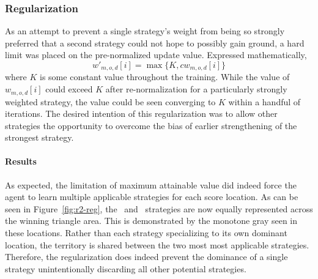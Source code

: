 

\subsubsection*{Regularization}


As an attempt to prevent a single strategy's weight from being so strongly 
preferred that a second strategy could not hope to possibly gain ground,
a hard limit was placed on the pre-normalized update value.
%
Expressed mathematically,
\[
    w'_{m,o,d}[i] = \max\{K,cw_{m,o,d}[i]\}
\]
where $K$ is some constant value throughout the training.
%
While the value of $w_{m,o,d}[i]$ could exceed $K$ after re-normalization
for a particularly strongly weighted strategy,
the value could be seen converging to $K$ within a handful of iterations.
%
The desired intention of this regularization was to allow other strategies
the opportunity to overcome the bias of earlier strengthening of the strongest
strategy.

\paragraph*{Results}







As expected,
the limitation of maximum attainable value did indeed force the agent to learn
multiple applicable strategies for each score location.
%
As can be seen in Figure~\ref{fig:r2-reg},
the \handmaxmin\ and \handmaxavg\ strategies are now equally represented across
the winning triangle area.
%
This is demonstrated by the monotone gray seen in these locations.
%
Rather than each strategy specializing to its own dominant location,
the territory is shared between the two most most applicable strategies.
%
Therefore,
the regularization does indeed prevent the dominance of a single strategy
unintentionally discarding all other potential strategies.

